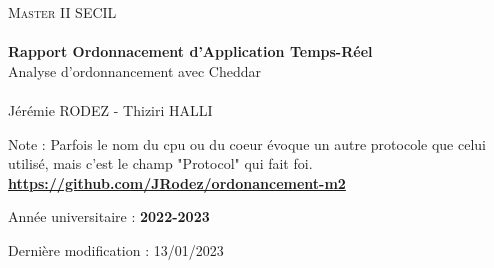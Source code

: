 \begin{titlepage}
    \centering
    \begin{center}\vspace*{\fill}

        \hspace*{.3in}
        \textsc{\Large Master II SECIL}\\[2cm]

        \noindent\makebox[\linewidth]{\rule{.7\paperwidth}{.6pt}}\\[1.5cm]
        { \huge \bfseries Rapport Ordonnacement d'Application Temps-Réel}\\[1cm]
        \LARGE{Analyse d'ordonnancement avec Cheddar}\\[1.5cm]
        \noindent\makebox[\linewidth]{\rule{.7\paperwidth}{.6pt}}\\[1.5cm]
        \Large{Jérémie RODEZ - Thiziri HALLI }\\[2cm]

        \vspace*{\fill}
    \end{center}

    Note : Parfois le nom du cpu ou du coeur évoque un autre protocole que celui utilisé,
    mais c'est le champ "Protocol" qui fait foi.\\[1cm]

    \bigskip
    \href{https://github.com/JRodez/ordonancement-m2}{\textbf{https://github.com/JRodez/ordonancement-m2}}\\[3.5cm]
    \normalsize

    Année universitaire : \textbf{2022-2023}

    Dernière modification : 13/01/2023

\end{titlepage}